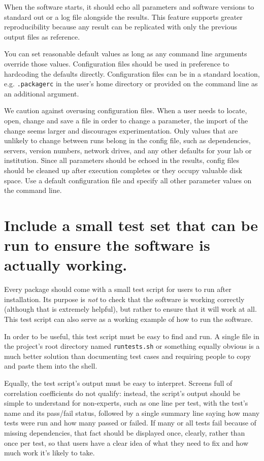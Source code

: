 \documentclass[10pt]{article}
\begin{document}
When the software starts, it should echo all parameters and software
versions to standard out or a log file alongside the results. This
feature supports greater reproducibility because any result can be
replicated with only the previous output files as reference.

You can set reasonable default values
as long as any command line arguments
override those values. Configuration files should be used in preference
to hardcoding the defaults directly. Configuration files can be in a standard
location, e.g. \texttt{.packagerc} in the user's home directory or
provided on the command line as an additional argument.

We caution against overusing configuration files. When a user needs to
locate, open, change and save a file in order to change a parameter, the
import of the change seems larger and discourages experimentation. 
Only values that are unlikely to
change between runs belong in the config file, such as dependencies,
servers, version numbers, network drives, and any other defaults for
your lab or institution. 
Since
all parameters should be echoed in the results, config files should be
cleaned up after execution completes or they occupy valuable disk space.
Use a default configuration file and specify all other parameter values on the
command line.

\section{Include a small test set that can be run to ensure the software is actually working.}

Every package should come with a small test script for users to run
after installation. Its purpose is \emph{not} to check that the software
is working correctly (although that is extremely helpful), but rather to
ensure that it will work at all. This test script can also serve as a
working example of how to run the software.

In order to be useful, this test script must be easy to find and run. A
single file in the project's root directory named \texttt{runtests.sh}
or something equally obvious is a much better solution than documenting
test cases and requiring people to copy and paste them into the shell.

Equally, the test script's output must be easy to interpret. Screens
full of correlation coefficients do not qualify: instead, the script's
output should be simple to understand for non-experts,
such as one line per test, with the test's name
and its pass/fail status, followed by a single summary line saying how
many tests were run and how many passed or failed. If many or all tests
fail because of missing dependencies, that fact should be displayed
once, clearly, rather than once per test, so that users have a clear
idea of what they need to fix and how much work it's likely to take.
\end{document}
